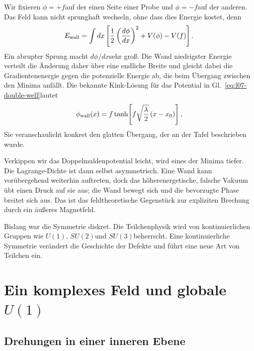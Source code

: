 Wir fixieren \(\phi=+f\)auf der einen Seite einer Probe und \(\phi=-f\)auf der anderen. Das Feld kann nicht sprunghaft wechseln, ohne dass dies Energie kostet, denn
\begin{equation}
  E_{\rm wall}
  =\int dx\left[
      \frac12\left(\frac{d\phi}{dx}\right)^2+V(\phi)-V(f)
    \right].
  \label{eq:l07-wall-energy}
\end{equation}
Ein abrupter Sprung macht \(d\phi/dx\)sehr groß. Die Wand niedrigster Energie verteilt die Änderung daher über eine endliche Breite und gleicht dabei die Gradientenenergie gegen die potenzielle Energie ab, die beim Übergang zwischen den Minima anfällt. Die bekannte Kink-Lösung für das Potential in Gl.~\eqref{eq:l07-double-well}lautet
\begin{equation}
  \phi_{\rm wall}(x)
  =f\tanh\!\left[f\sqrt{\frac{\lambda}{2}}\,(x-x_0)\right],
  \label{eq:l07-kink}
\end{equation}
Sie veranschaulicht konkret den glatten Übergang, der an der Tafel beschrieben wurde.

Verkippen wir das Doppelmuldenpotential leicht, wird eines der Minima tiefer. Die Lagrange-Dichte ist dann selbst asymmetrisch. Eine Wand kann vorübergehend weiterhin auftreten, doch das höherenergetische, falsche Vakuum übt einen Druck auf sie aus; die Wand bewegt sich und die bevorzugte Phase breitet sich aus. Das ist das feldtheoretische Gegenstück zur expliziten Brechung durch ein äußeres Magnetfeld.

Bislang war die Symmetrie diskret. Die Teilchenphysik wird von kontinuierlichen Gruppen wie \(U(1)\), \(SU(2)\)und \(SU(3)\)beherrscht. Eine kontinuierliche Symmetrie verändert die Geschichte der Defekte und führt eine neue Art von Teilchen ein.

\section{Ein komplexes Feld und globale \texorpdfstring{\(U(1)\)}{U(1)}}

\subsection{Drehungen in einer inneren Ebene}

